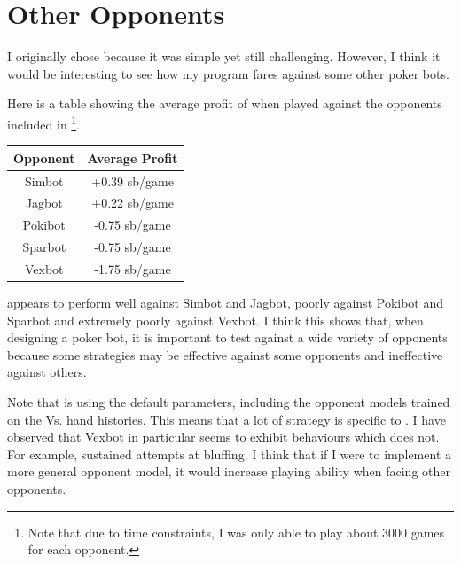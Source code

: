 \section{Other Opponents}						%

I originally chose \sbt because it was simple yet still challenging. However, I think it would be interesting to see how my program fares against some other poker bots. 

Here is a table showing the average profit of \mbt when played against the opponents included in \pap{}\footnote{Note that due to time constraints, I was only able to play about 3000 games for each opponent.}.
\begin{center}
\begin{tabular}{c|c}
Opponent & Average Profit \\
\hline
Simbot & +0.39 sb/game \\
Jagbot & +0.22 sb/game \\
Pokibot & -0.75 sb/game \\
Sparbot & -0.75 sb/game \\
Vexbot & -1.75 sb/game \\
\end{tabular}
\end{center}

\mbt appears to perform well against Simbot and Jagbot, poorly against Pokibot and Sparbot and extremely poorly against Vexbot. I think this shows that, when designing a poker bot, it is important to test against a wide variety of opponents because some strategies may be effective against some opponents and ineffective against others.



Note that \mbt is using the default parameters, including the opponent models trained on the \sbt Vs. \sbt hand histories. This means that a lot of \mbts strategy is specific to \sbt. I have observed that Vexbot in particular seems to exhibit behaviours which \sbt does not. For example, sustained attempts at bluffing. I think that if I were to implement a more general opponent model, it would increase \mbts playing ability when facing other opponents.




